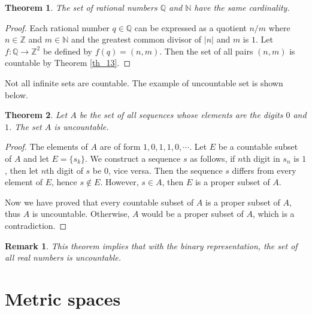 \documentclass[10pt]{book}
\newtheorem{theorem}{Theorem}[chapter]
\newtheorem{remark}{Remark}[chapter]
\theoremstyle{definition}
\numberwithin{equation}{chapter}
\begin{document}
\medskip

\begin{theorem}
The set of rational numbers $\mathbb{Q}$ and $\mathbb{N}$ have the same cardinality.
\end{theorem}
\begin{proof}
Each rational number $q \in \mathbb{Q}$ can be expressed as a quotient $n/m$ where $n \in \mathbb{Z}$ and $m \in \mathbb{N}$ and the greatest common divisor of $\left|n\right|$ and $m$ is $1$. Let $f: \mathbb{Q} \to \mathbb{Z}^2$ be defined by $f(q) = (n,m)$. Then the set of all pairs $(n,m)$ is countable by Theorem \ref{th_13}.
\end{proof}

\medskip

Not all infinite sets are countable. The example of uncountable set is shown below.

\medskip

\begin{theorem}
Let $A$ be the set of all sequences whose elements are the digits $0$ and $1$. The set $A$ is uncountable.
\end{theorem}
\begin{proof}
The elements of $A$ are of form $1,0,1,1,0,\cdots$. Let $E$ be a countable subset of $A$ and let $E = \{s_k\}$. We construct a sequence $s$ as follows, if $n$th digit in $s_n$ is $1$, then let $n$th digit of $s$ be $0$, vice versa. Then the sequence $s$ differs from every element of $E$, hence $s \notin E$. However, $s \in A$, then $E$ is a proper subset of $A$.

Now we have proved that every countable subset of $A$ is a proper subset of $A$, thus $A$ is uncountable. Otherwise, $A$ would be a proper subset of $A$, which is a contradiction. 
\end{proof}

\begin{remark}
This theorem implies that with the binary representation, the set of all real numbers is uncountable.
\end{remark}

\medskip


\section{Metric spaces}
\end{document}

